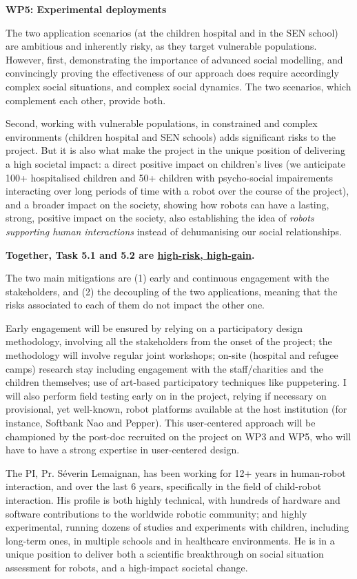 \documentclass[11pt,a4paper]{report}
\begin{document}
\vspace{1em}

\textbf{WP5: Experimental deployments}

The two application scenarios (at the children hospital and in the SEN school)
are ambitious and inherently risky, as they target vulnerable populations.
However, first, demonstrating the importance of advanced social modelling, and
convincingly proving the effectiveness of our approach does require accordingly
complex social situations, and complex social dynamics. The two scenarios, which
complement each other, provide both.

Second, working with vulnerable populations, in constrained and complex
environments (children hospital and SEN schools) adds significant risks to the
project. But it is also what make the project in the unique position of
delivering a high societal impact: a direct positive impact on children's lives
(we anticipate 100+ hospitalised children and 50+ children with psycho-social
impairements interacting over long periods of time with a robot over the course
of the project), and a broader impact on the society, showing how robots can
have a lasting, strong, positive impact on the society, also establishing the
idea of \emph{robots supporting human interactions} instead of dehumanising our
social relationships.

\textbf{Together, Task 5.1 and 5.2 are \ul{high-risk, high-gain}.}

The two main mitigations are (1) early and continuous engagement with the
stakeholders, and (2) the decoupling of the two applications, meaning that the
risks associated to each of them do not impact the other one.

Early engagement will be ensured by relying on a participatory design
methodology, involving all the stakeholders from the onset of the project; the
methodology will involve regular joint workshops; on-site (hospital and refugee
camps) research stay including engagement with the staff/charities and the
children themselves; use of art-based participatory techniques like puppetering.
I will also perform field testing early on in the project, relying if necessary
on provisional, yet well-known, robot platforms available at the host
institution (for instance, Softbank Nao and Pepper). This user-centered approach
will be championed by the post-doc recruited on the project on WP3 and WP5, who will
have to have a strong expertise in user-centered design.

The PI, Pr. Séverin Lemaignan, has been working for 12+
years in human-robot interaction, and over the last 6 years, specifically in the
field of child-robot interaction.  His profile is both highly technical, with
hundreds of hardware and software contributions to the worldwide robotic
community; and highly experimental, running dozens of studies and experiments
with children, including long-term ones, in multiple schools and in healthcare
environments. He is in a unique position to deliver both a scientific
breakthrough on social situation assessment for robots, and a high-impact
societal change.
\end{document}
